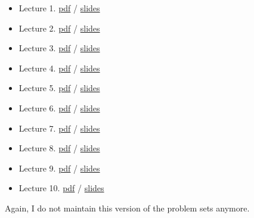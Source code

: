 \documentclass[]{book}
\providecommand{\tightlist}{%
  \setlength{\itemsep}{0pt}\setlength{\parskip}{0pt}}
\theoremstyle{definition}
\theoremstyle{definition}
\theoremstyle{definition}
\theoremstyle{remark}
\begin{document}
\begin{itemize}
\tightlist
\item
  Lecture 1. \href{old/lecture1.pdf}{pdf} /
  \href{old/lecture1-slides.pdf}{slides}
\item
  Lecture 2. \href{old/lecture2.pdf}{pdf} /
  \href{old/lecture2-slides.pdf}{slides}
\item
  Lecture 3. \href{old/lecture3.pdf}{pdf} /
  \href{old/lecture3-slides.pdf}{slides}
\item
  Lecture 4. \href{old/lecture4.pdf}{pdf} /
  \href{old/lecture4-slides.pdf}{slides}
\item
  Lecture 5. \href{old/lecture5.pdf}{pdf} /
  \href{old/lecture5-slides.pdf}{slides}
\item
  Lecture 6. \href{old/lecture6.pdf}{pdf} /
  \href{old/lecture6-slides.pdf}{slides}
\item
  Lecture 7. \href{old/lecture7.pdf}{pdf} /
  \href{old/lecture7-slides.pdf}{slides}
\item
  Lecture 8. \href{old/lecture8.pdf}{pdf} /
  \href{old/lecture8-slides.pdf}{slides}
\item
  Lecture 9. \href{old/lecture9.pdf}{pdf} /
  \href{old/lecture9-slides.pdf}{slides}
\item
  Lecture 10. \href{old/lecture10.pdf}{pdf} /
  \href{old/lecture10-slides.pdf}{slides}
\end{itemize}

Again, I do not maintain this version of the problem sets anymore.
\end{document}
